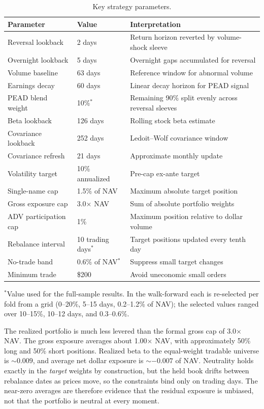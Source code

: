 \documentclass[11pt]{article}
\begin{document}
\begin{table}[t]
\centering
\caption{Key strategy parameters.}
\label{tab:params}
\begin{tabular}{lll}
\toprule
Parameter & Value & Interpretation \\
\midrule
Reversal lookback & 2 days & Return horizon reverted by volume-shock sleeve \\
Overnight lookback & 5 days & Overnight gaps accumulated for reversal \\
Volume baseline & 63 days & Reference window for abnormal volume \\
Earnings decay & 60 days & Linear decay horizon for PEAD signal \\
PEAD blend weight & 10\%$^{*}$ & Remaining 90\% split evenly across reversal sleeves \\
Beta lookback & 126 days & Rolling stock beta estimate \\
Covariance lookback & 252 days & Ledoit--Wolf covariance window \\
Covariance refresh & 21 days & Approximate monthly update \\
Volatility target & 10\% annualized & Pre-cap ex-ante target \\
Single-name cap & 1.5\% of NAV & Maximum absolute target position \\
Gross exposure cap & 3.0$\times$ NAV & Sum of absolute portfolio weights \\
ADV participation cap & 1\% & Maximum position relative to dollar volume \\
Rebalance interval & 10 trading days$^{*}$ & Target positions updated every tenth day \\
No-trade band & 0.6\% of NAV$^{*}$ & Suppress small target changes \\
Minimum trade & \$200 & Avoid uneconomic small orders \\
\bottomrule
\end{tabular}

\smallskip
{\footnotesize $^{*}$Value used for the full-sample results. In the walk-forward each is re-selected per fold from a grid (0--20\%, 5--15 days, 0.2--1.2\% of NAV); the selected values ranged over 10--15\%, 10--12 days, and 0.3--0.6\%.\par}
\end{table}

The realized portfolio is much less levered than the formal gross cap of 3.0$\times$ NAV. The gross exposure averages about 1.00$\times$ NAV, with approximately 50\% long and 50\% short positions. Realized beta to the equal-weight tradable universe is \(\sim 0.009\), and average net dollar exposure is $\sim -0.007$ of NAV. Neutrality holds exactly in the \emph{target} weights by construction, but the held book drifts between rebalance dates as prices move, so the constraints bind only on trading days. The near-zero averages are therefore evidence that the residual exposure is unbiased, not that the portfolio is neutral at every moment.
\end{document}
